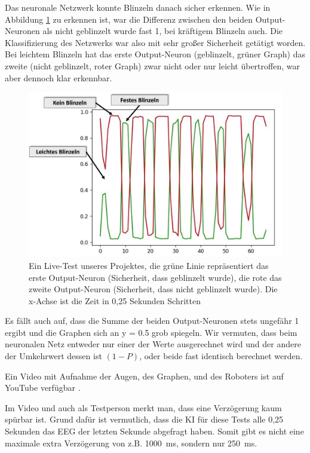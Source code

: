 \documentclass{scrartcl}
\begin{document}
	Das neuronale Netzwerk konnte Blinzeln danach sicher erkennen. Wie in Abbildung \ref{test-graph} zu erkennen ist, war die Differenz zwischen den beiden Output-Neuronen als nicht geblinzelt wurde fast 1, bei kräftigem Blinzeln auch. Die Klassifizierung des Netzwerks war also mit sehr großer Sicherheit getätigt worden. Bei leichtem Blinzeln hat das erste Output-Neuron (geblinzelt, grüner Graph) das zweite (nicht geblinzelt, roter Graph) zwar nicht oder nur leicht übertroffen, war aber dennoch klar erkennbar.

	\begin{figure}
		\includegraphics[width=\textwidth]{pictures/Test-Graph-annotated.png}
		\caption{Ein Live-Test unseres Projektes, die grüne Linie repräsentiert das erste Output-Neuron (Sicherheit, dass geblinzelt wurde), die rote das zweite Output-Neuron (Sicherheit, dass nicht geblinzelt wurde). Die x-Achse ist die Zeit in 0,25 Sekunden Schritten}
		\label{test-graph}
	\end{figure}

	Es fällt auch auf, dass die Summe der beiden Output-Neuronen stets ungefähr 1 ergibt und die Graphen sich an y = 0.5 grob spiegeln. Wir vermuten, dass beim neuronalen Netz entweder nur einer der Werte ausgerechnet wird und der andere der Umkehrwert dessen ist $\left(1 - P\right)$, oder beide fast identisch berechnet werden.
	
	Ein Video mit Aufnahme der Augen, des Graphen, und des Roboters ist auf YouTube verfügbar \cite{projekt-video}.

	Im Video und auch als Testperson merkt man, dass eine Verzögerung kaum spürbar ist. Grund dafür ist vermutlich, dass die KI für diese Tests alle 0,25 Sekunden das EEG der letzten Sekunde abgefragt  haben. Somit gibt es nicht eine maximale extra Verzögerung von z.B. \qty{1000}{\milli\second}, sondern nur \qty{250}{\milli\second}.
\end{document}
